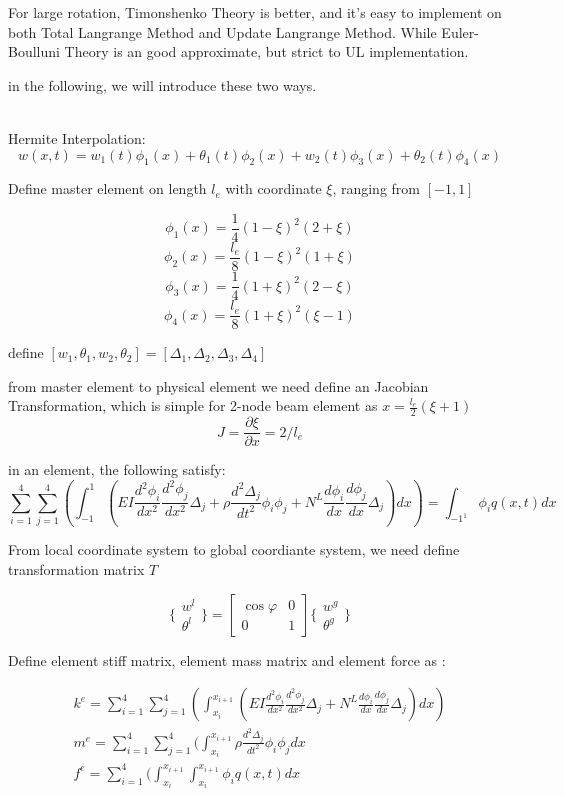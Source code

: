 \documentclass[11pt]{article}
\begin{document}
\begin{enumerate}
For large rotation, Timonshenko Theory is better, and it's easy to implement on both Total Langrange Method and Update Langrange Method. While Euler-Boulluni Theory is  an good approximate, but strict to UL implementation.

in the following, we will introduce these two ways.

 \\

Hermite Interpolation:
$$ w(x,t) = w_1(t) \phi_1(x) + \theta_1(t) \phi_2(x) + w_2(t) \phi_3(x) + \theta_2(t) \phi_4(x) $$

Define master element on length $l_e$ with coordinate $\xi$, ranging from $[-1, 1]$

$$ \phi_1(x) = \frac{1}{4} (1-\xi)^2 (2+\xi) $$
$$ \phi_2(x) = \frac{l_e}{8}(1-\xi)^2(1+\xi) $$
$$ \phi_3(x) = \frac{1}{4} (1+\xi)^2 (2-\xi) $$
$$ \phi_4(x) = \frac{l_e}{8}(1+\xi)^2(\xi-1) $$

define $[w_1, \theta_1, w_2, \theta_2] = [ \Delta_1, \Delta_2,\Delta_3, \Delta_4] $

from master element to physical element we need define an Jacobian Transformation, which is simple for 2-node  beam element  as $ x = \frac{l_e}{2} (\xi + 1)$
$$ J = \frac{\partial \xi}{\partial x} = 2/l_e $$


in an element, the following satisfy:
$$ \sum_{i=1}^4 \sum_{j=1}^4 ( \int_{-1}^{1}( EI \frac{d^2 \phi_i}{dx^2} \frac{d^2 \phi_j}{dx^2}\Delta_j + \rho \frac{d^2 \Delta_j}{dt^2} \phi_i \phi_j + N^L \frac{d \phi_i}{dx} \frac{d \phi_j}{dx} \Delta_j) dx) = \int_{-1^{1}} \phi_i q(x,t) dx $$  

From local coordinate system to global coordiante system, we need define transformation matrix $T$

$$
\{ \begin{array}{c} w^l \\ \theta^l \end{array} \} = \begin{bmatrix} \cos \varphi & 0 \\ 0 & 1 \end{bmatrix} \{ \begin{array}{c} w^g \\ \theta^g \end{array} \}
$$

Define element stiff matrix, element mass matrix and element force as :

\begin{subequations}
\begin{align}
k^e = \sum_{i=1}^4 \sum_{j=1}^4 ( \int_{x_i}^{x_{i+1}}( EI \frac{d^2 \phi_i}{dx^2} \frac{d^2 \phi_j}{dx^2}\Delta_j + N^L \frac{d \phi_i}{dx} \frac{d \phi_j}{dx} \Delta_j) dx) \\
m^e =  \sum_{i=1}^4 \sum_{j=1}^4 ( \int_{x_i}^{x_{i+1}} \rho \frac{d^2 \Delta_j}{dt^2} \phi_i \phi_j dx \\
f^e =  \sum_{i=1}^4 ( \int_{x_i}^{x_{i+1}} \int_{x_i}^{x_{i+1}} \phi_i q(x,t) dx
\end{align}
\end{subequations}


\end{enumerate}
\end{document}
